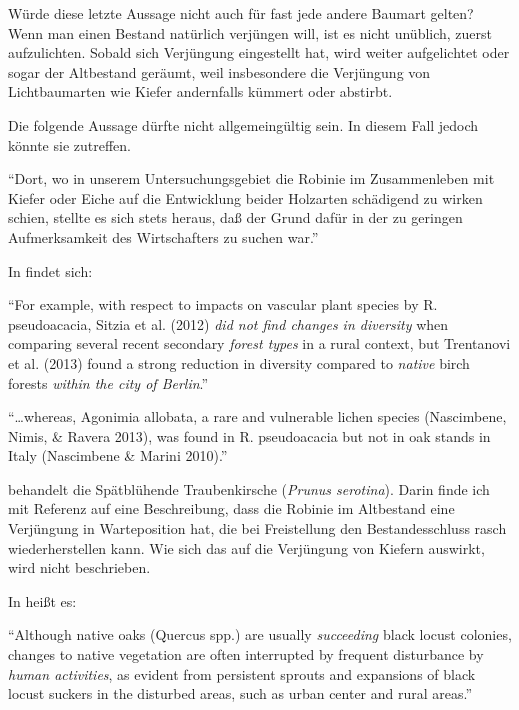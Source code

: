 \documentclass[twocolumn]{scrartcl}
\begin{document}
Würde diese letzte Aussage nicht auch für fast jede andere Baumart
gelten? Wenn man einen Bestand natürlich verjüngen will, ist es nicht
unüblich, zuerst aufzulichten. Sobald sich Verjüngung eingestellt hat,
wird weiter aufgelichtet oder sogar der Altbestand geräumt, weil
insbesondere die Verjüngung von Lichtbaumarten wie Kiefer andernfalls
kümmert oder abstirbt.

Die folgende Aussage dürfte nicht allgemeingültig sein. In diesem Fall
jedoch könnte sie zutreffen.

\hypertarget{german:erteld1952robinieErtrag}{\enquote{Dort, wo in unserem Untersuchungsgebiet die Robinie im Zusammenleben mit Kiefer oder Eiche auf die Entwicklung beider Holzarten schädigend zu wirken schien, stellte es sich stets heraus, daß der Grund dafür in der zu geringen Aufmerksamkeit des Wirtschafters zu suchen war.}} \citep[S.~90]{erteld1952robinieErtrag}

In \cite{campagnaro2018alien} findet sich:

\enquote{For example, with respect to impacts on vascular plant
  species by R.  pseudoacacia, Sitzia et al. (2012) \emph{did not find
  changes in diversity} when comparing several recent secondary
  \emph{forest types} in a rural context, but Trentanovi et al. (2013)
  found a strong reduction in diversity compared to \emph{native}
  birch forests \emph{within the city of Berlin}.}

\enquote{\dots whereas, Agonimia allobata, a rare and vulnerable
  lichen species (Nascimbene, Nimis, \& Ravera 2013), was found in
  R. pseudoacacia but not in oak stands in Italy (Nascimbene \& Marini
  2010).}

\citet{sebert2007invasive} behandelt die Spätblühende Traubenkirsche
(\emph{Prunus serotina}). Darin finde ich mit Referenz auf
\citet{lee2004robinie} eine Beschreibung, dass die Robinie im
Altbestand eine Verjüngung in Warteposition hat, die bei Freistellung
den Bestandesschluss rasch wiederherstellen kann. Wie sich das auf die
Verjüngung von Kiefern auswirkt, wird nicht beschrieben.

In \citet{lee2004robinie} heißt es:

\enquote{Although native oaks (Quercus spp.) are usually
  \emph{succeeding} black locust colonies, changes to native
  vegetation are often interrupted by frequent disturbance by
  \emph{human activities}, as evident from persistent sprouts and
  expansions of black locust suckers in the disturbed areas, such as
  urban center and rural areas.}
\end{document}
